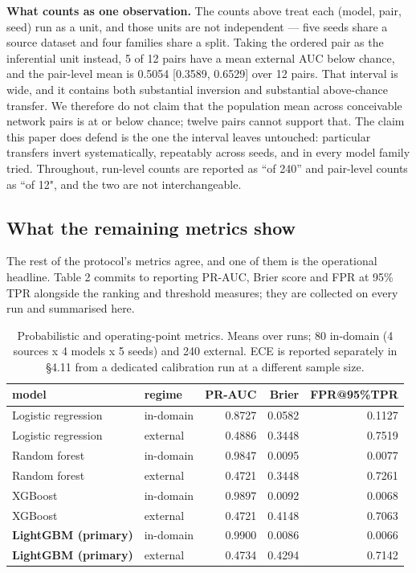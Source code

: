 \documentclass[journal]{IEEEtran}
\begin{document}
\textbf{What counts as one observation.} The counts above treat each (model, pair, seed) run as a unit, and those units are not independent --- five seeds share a source dataset and four families share a split. Taking the ordered pair as the inferential unit instead, 5 of 12 pairs have a mean external AUC below chance, and the pair-level mean is 0.5054 [0.3589, 0.6529] over 12 pairs. That interval is wide, and it contains both substantial inversion and substantial above-chance transfer. We therefore do not claim that the population mean across conceivable network pairs is at or below chance; twelve pairs cannot support that. The claim this paper does defend is the one the interval leaves untouched: particular transfers invert systematically, repeatably across seeds, and in every model family tried. Throughout, run-level counts are reported as ``of 240'' and pair-level counts as ``of 12", and the two are not interchangeable.

\subsection{What the remaining metrics show}

The rest of the protocol's metrics agree, and one of them is the operational headline. Table 2 commits to reporting PR-AUC, Brier score and FPR at 95\% TPR alongside the ranking and threshold measures; they are collected on every run and summarised here.

\begin{table}[htbp]\centering\scriptsize
\caption{Probabilistic and operating-point metrics. Means over runs; 80 in-domain (4 sources x 4 models x 5 seeds) and 240 external. ECE is reported separately in §4.11 from a dedicated calibration run at a different sample size.}
\begin{tabular}{llrrr}
\toprule
model & regime & PR-AUC & Brier & FPR@95\%TPR \\
\midrule
Logistic regression & in-domain & 0.8727 & 0.0582 & 0.1127 \\
Logistic regression & external & 0.4886 & 0.3448 & 0.7519 \\
Random forest & in-domain & 0.9847 & 0.0095 & 0.0077 \\
Random forest & external & 0.4721 & 0.3448 & 0.7261 \\
XGBoost & in-domain & 0.9897 & 0.0092 & 0.0068 \\
XGBoost & external & 0.4721 & 0.4148 & 0.7063 \\
\textbf{LightGBM (primary)} & in-domain & 0.9900 & 0.0086 & 0.0066 \\
\textbf{LightGBM (primary)} & external & 0.4734 & 0.4294 & 0.7142 \\
\bottomrule
\end{tabular}
\end{table}
\end{document}
